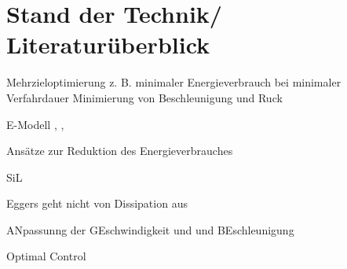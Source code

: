 \chapter{Stand der Technik/ Literaturüberblick}

Mehrzieloptimierung z. B. minimaler Energieverbrauch bei minimaler Verfahrdauer \cite{Lin.2018} Minimierung von Beschleunigung und Ruck  \cite{Saravanan.2008}

E-Modell \cite{Pellicciari.2011}, \cite[S.~1]{Hansen.2012}, \cite{Ziaukas.2017}

Ansätze zur Reduktion des Energieverbrauches  \cite{Paryanto.2015} \cite{Pellicciari.2015} \cite{Carabin.2017}

SiL \cite[S-~56]{Eggers.2019} 

Eggers geht nicht von Dissipation aus

ANpassunng der GEschwindigkeit und und BEschleunigung \cite[S.~57]{Eggers.2019}

Optimal Control \cite{Bjorkenstam.2013}